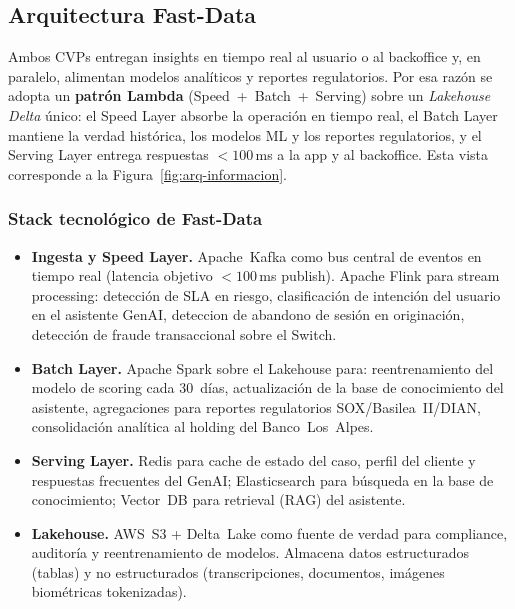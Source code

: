 \documentclass[11pt,letterpaper]{article}
\begin{document}
\subsection{Arquitectura Fast-Data}
\label{sec:fastdata}

Ambos CVPs entregan insights en tiempo real al usuario o al backoffice y,
en paralelo, alimentan modelos analíticos y reportes regulatorios. Por
esa razón se adopta un \textbf{patrón Lambda} (Speed~+~Batch~+~Serving)
sobre un \emph{Lakehouse Delta} único: el Speed Layer absorbe la
operación en tiempo real, el Batch Layer mantiene la verdad histórica,
los modelos ML y los reportes regulatorios, y el Serving Layer entrega
respuestas $<100$\,ms a la app y al backoffice. Esta vista corresponde a
la Figura~\ref{fig:arq-informacion}.

\subsubsection{Stack tecnológico de Fast-Data}

\begin{itemize}[leftmargin=1.4em,topsep=2pt,itemsep=3pt]
  \item \textbf{Ingesta y Speed Layer.} Apache~Kafka como bus central de
        eventos en tiempo real (latencia objetivo $<100$\,ms publish). Apache
        Flink para stream processing: detección de SLA en riesgo,
        clasificación de intención del usuario en el asistente GenAI,
        deteccion de abandono de sesión en originación, detección de
        fraude transaccional sobre el Switch.
  \item \textbf{Batch Layer.} Apache Spark sobre el Lakehouse para:
        reentrenamiento del modelo de scoring cada $30$~días, actualización
        de la base de conocimiento del asistente, agregaciones para
        reportes regulatorios SOX/Basilea~II/DIAN, consolidación analítica
        al holding del Banco~Los~Alpes.
  \item \textbf{Serving Layer.} Redis para cache de estado del caso,
        perfil del cliente y respuestas frecuentes del GenAI;
        Elasticsearch para búsqueda en la base de conocimiento; Vector~DB
        para retrieval (RAG) del asistente.
  \item \textbf{Lakehouse.} AWS~S3 + Delta~Lake como fuente de verdad
        para compliance, auditoría y reentrenamiento de modelos. Almacena
        datos estructurados (tablas) y no estructurados (transcripciones,
        documentos, imágenes biométricas tokenizadas).
\end{itemize}
\end{document}
